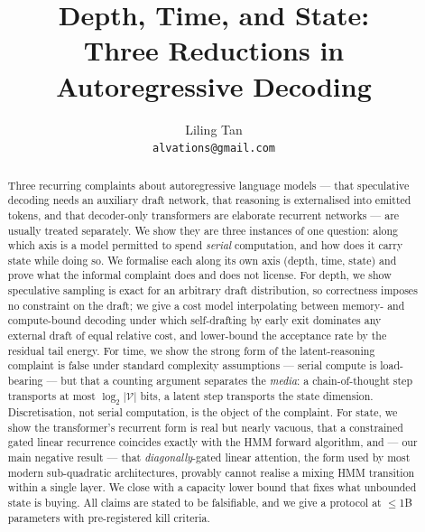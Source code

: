 \documentclass{article}
\title{Depth, Time, and State:\\Three Reductions in Autoregressive Decoding}
\author{%
  Liling Tan \\
  \texttt{alvations@gmail.com} \\
}
\theoremstyle{plain}
\theoremstyle{definition}
\newcommand{\Vocab}{\mathcal{V}}
\begin{document}
\maketitle

\begin{abstract}
Three recurring complaints about autoregressive language models --- that
speculative decoding needs an auxiliary draft network, that reasoning is
externalised into emitted tokens, and that decoder-only transformers are
elaborate recurrent networks --- are usually treated separately. We show they
are three instances of one question: along which axis is a model permitted to
spend \emph{serial} computation, and how does it carry state while doing so.
We formalise each along its own axis (depth, time, state) and prove what the
informal complaint does and does not license.
For depth, we show speculative sampling is exact for an arbitrary draft
distribution, so correctness imposes no constraint on the draft; we give a cost
model interpolating between memory- and compute-bound decoding under which
self-drafting by early exit dominates any external draft of equal relative cost,
and lower-bound the acceptance rate by the residual tail energy.
For time, we show the strong form of the latent-reasoning complaint is false
under standard complexity assumptions --- serial compute is load-bearing --- but
that a counting argument separates the \emph{media}: a chain-of-thought step
transports at most $\log_2|\Vocab|$ bits, a latent step transports the state
dimension. Discretisation, not serial computation, is the object of the
complaint.
For state, we show the transformer's recurrent form is real but nearly vacuous,
that a constrained gated linear recurrence coincides exactly with the HMM
forward algorithm, and --- our main negative result --- that
\emph{diagonally}-gated linear attention, the form used by most modern
sub-quadratic architectures, provably cannot realise a mixing HMM transition
within a single layer. We close with a capacity lower bound that fixes what
unbounded state is buying.
All claims are stated to be falsifiable, and we give a protocol at $\le$1B
parameters with pre-registered kill criteria.
\end{abstract}









\end{document}
